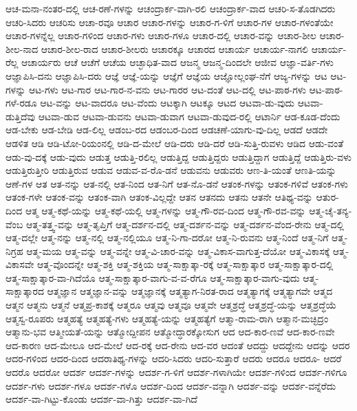 {ಆಚ-ಮನಾ-ನಂತರ-ದಲ್ಲಿ
ಆಚ-ರಣೆ-ಗಳನ್ನು
ಆಚಂದ್ರಾರ್ಕ-ವಾಗಿ-ರಲಿ
ಆಚಂದ್ರಾರ್ಕ-ವಾದ
ಆಚರಿ-ಸ-ತೊಡಗಿದರು
ಆಚರಿ-ಸಿದರು
ಆಚರಿಸು
ಆಚಾ-ರವೂ
ಆಚಾರ
ಆಚಾರ-ಗಳನ್ನು
ಆಚಾರ-ಗ-ಳಿಗೆ
ಆಚಾರ-ಗಳ
ಆಚಾರ-ಗಳಂತೆಯೇ
ಆಚಾರ-ಗಳನ್ನೆಲ್ಲ
ಆಚಾರ-ಗಳಿಂದ
ಆಚಾರ-ಗಳು
ಆಚಾರ-ಗಳೂ
ಆಚಾರ-ದಲ್ಲಿ
ಆಚಾರ-ವನ್ನು
ಆಚಾರ-ಶೀಲ
ಆಚಾರ-ಶೀಲ-ನಾದ
ಆಚಾರ-ಶೀಲ-ರಾದ
ಆಚಾರ-ಶೀಲರು
ಆಚಾರಕ್ಕೂ
ಆಚಾರದ
ಆಚಾರ್ಯ
ಆಚಾರ್ಯ-ನಾಗಲಿ
ಆಚಾರ್ಯ-ರೆಲ್ಲ
ಆಚಾರ್ಯರು
ಆಚೆ
ಆಚೆಗೆ
ಆಚೆಯ
ಆಚ್ಛಾಧಿತ-ವಾದ
ಆಜನ್ಮ
ಆಜನ್ಮ-ದಿಂದಲೇ
ಆಜೀವ
ಆಜ್ಞಾ-ವರ್ತಿ-ಗಳು
ಆಜ್ಞಾಪಿಸಿ-ದನು
ಆಜ್ಞಾಪಿಸಿ-ದರು
ಆಜ್ಞೆ
ಆಜ್ಞೆ-ಯನ್ನು
ಆಜ್ಞೆಗೆ
ಆಜ್ಞೆಯ
ಆಜ್ಞೋಲ್ಲಂಘ-ನೆಗೆ
ಆಜ್ಯ-ಗಳನ್ನು
ಆಟ
ಆಟ-ಗಳನ್ನು
ಆಟ-ಗಳು
ಆಟ-ಗಾರ
ಆಟ-ಗಾರ-ನ-ವನು
ಆಟ-ಗಾರರ
ಆಟ-ದಂತೆ
ಆಟ-ದಲ್ಲಿ
ಆಟ-ಪಾಠ-ಗಳು
ಆಟ-ಪಾಠ-ಗಳೆ-ರಡೂ
ಆಟ-ವನ್ನು
ಆಟ-ವಾದರೂ
ಆಟ-ವೆಂದು
ಆಟಕ್ಕಾಗಿ
ಆಟಕ್ಕೂ
ಆಟದ
ಆಟವಾ-ಡು-ವುದು
ಆಟವಾ-ಡುತ್ತಿದೆವು
ಆಟವಾ-ಡುವ
ಆಟವಾ-ಡುವನು
ಆಟವಾ-ಡುವಾಗ
ಆಟವಾ-ಡುವುದ-ರಲ್ಲಿ
ಆಟಾರ್ನಿ
ಆಡ-ಕೂಡ-ದೆಂದು
ಆಡ-ಬೇಕು
ಆಡ-ಬೇಡಿ
ಆಡ-ಲಿಲ್ಲ
ಆಡಂಬ-ರದ
ಆಡಂಬರ-ದಿಂದ
ಆಡಚಣೆ-ಯಾಗು-ವು-ದಿಲ್ಲ
ಆಡದೆ
ಆಡದೇ
ಆಡಳಿತ
ಆಡಿ
ಆಡಿ-ಟೋ-ರಿಯಂನಲ್ಲಿ
ಆಡಿ-ದ-ಮೇಲೆ
ಆಡಿ-ದರು
ಆಡಿ-ದರೆ
ಆಡಿ-ಸುತ್ತಿ-ರುವಳು
ಆಡಿದ
ಆಡು-ವಂತೆ
ಆಡು-ವು-ದಕ್ಕೆ
ಆಡು-ವುದು
ಆಡುತ್ತ
ಆಡುತ್ತಿ-ರಲಿಲ್ಲ
ಆಡುತ್ತಿದ್ದ
ಆಡುತ್ತಿದ್ದರು
ಆಡುತ್ತಿದ್ದಾಗ
ಆಡುತ್ತಿದ್ದೆ
ಆಡುತ್ತಿರು-ವಳು
ಆಡುತ್ತಿರುತ್ತೀರಿ
ಆಡುತ್ತಿರುವ
ಆಡುವ
ಆಡುವ-ವ-ರೊ-ಡನೆ
ಆಡುವನು
ಆಡುವರು
ಆಣ-ತಿ-ಯಂತೆ
ಆಣತಿ-ಯನ್ನು
ಆಣೆ-ಗಳ
ಆತ
ಆತ-ನನ್ನು
ಆತ-ನಲ್ಲಿ
ಆತ-ನಿಂದ
ಆತ-ನಿಗೆ
ಆತ-ನೊ-ಡನೆ
ಆತಂಕ-ಗಳನ್ನು
ಆತಂಕ-ಗಳಿವೆ
ಆತಂಕ-ಗಳು
ಆತಂಕ-ಗಳೇ
ಆತಂಕ-ವನ್ನು
ಆತಂಕ-ವಾಗಿ
ಆತಂಕ-ವಿಲ್ಲದ್ದೇ
ಆತನ
ಆತನದು
ಆತನು
ಆತನೇ
ಆತಿಥ್ಯ-ವನ್ನು
ಆತುರ-ದಿಂದ
ಆತ್ಮ
ಆತ್ಮ-ಕಥೆ-ಯನ್ನು
ಆತ್ಮ-ಕಥೆ-ಯಲ್ಲಿ
ಆತ್ಮ-ಗಳನ್ನು
ಆತ್ಮ-ಗೌ-ರವ-ದಿಂದ
ಆತ್ಮ-ಗೌ-ರವ-ವನ್ನು
ಆತ್ಮ-ಚೈ-ತನ್ಯ-ವೆಂಬ
ಆತ್ಮ-ತತ್ತ್ವ-ವನ್ನು
ಆತ್ಮ-ತೃಪ್ತಿಗೆ
ಆತ್ಮ-ದರ್ಶನ-ದಲ್ಲಿ
ಆತ್ಮ-ದರ್ಶನ-ವನ್ನು
ಆತ್ಮ-ದರ್ಶನ-ವೆಂದ-ರೇನು
ಆತ್ಮ-ದಲ್ಲಿ
ಆತ್ಮ-ದಲ್ಲೇ
ಆತ್ಮ-ನನ್ನು
ಆತ್ಮ-ನಲ್ಲಿ
ಆತ್ಮ-ನಲ್ಲಿಯೂ
ಆತ್ಮ-ನಿ-ಗಾ-ದರೋ
ಆತ್ಮ-ನಿ-ರುವನು
ಆತ್ಮ-ನಿಂದೆ
ಆತ್ಮ-ನಿಗೆ
ಆತ್ಮ-ನಿಗ್ರಹ
ಆತ್ಮ-ಮಯ
ಆತ್ಮ-ವನ್ನು
ಆತ್ಮ-ವನ್ನೇ
ಆತ್ಮ-ವಿ-ಚಾರ-ವನ್ನು
ಆತ್ಮ-ವಿಕಾಸ-ವಾಗುತ್ತ-ದೆಯೋ
ಆತ್ಮ-ವಿಕಾಸಕ್ಕೆ
ಆತ್ಮ-ವಿಕಾಸವೇ
ಆತ್ಮ-ವೊಂದನ್ನೇ
ಆತ್ಮ-ಶಕ್ತಿ
ಆತ್ಮ-ಶಕ್ತಿಯ
ಆತ್ಮ-ಸಾಕ್ಷಾತ್ಕಾ-ರಕ್ಕೆ
ಆತ್ಮ-ಸಾಕ್ಷಾತ್ಕಾರ
ಆತ್ಮ-ಸಾಕ್ಷಾತ್ಕಾರ-ದಲ್ಲಿ
ಆತ್ಮ-ಸಾಕ್ಷಾತ್ಕಾರ-ವಾ-ಗಿದೆಯೊ
ಆತ್ಮ-ಸಾಕ್ಷಾತ್ಕಾರ-ವಾಗು-ವ-ವ-ರೆಗೂ
ಆತ್ಮ-ಸಾಕ್ಷಾತ್ಕಾರ-ವಾಗು-ವುದು
ಆತ್ಮ-ಸಾಕ್ಷಾತ್ಕಾರದ
ಆತ್ಮಜ್ಞಾನ
ಆತ್ಮಜ್ಞಾನ-ವನ್ನು
ಆತ್ಮಜ್ಞಾನಕ್ಕೆ
ಆತ್ಮತ್ಯಾಗ-ನಿರತ-ರಾದ
ಆತ್ಮತ್ಯಾಗಕ್ಕೆ
ಆತ್ಮತ್ಯಾಗವೇ
ಆತ್ಮದ
ಆತ್ಮನ
ಆತ್ಮನು
ಆತ್ಮನೆ
ಆತ್ಮಪ್ರ-ಕಾಶಕ್ಕೆ
ಆತ್ಮರೂ
ಆತ್ಮವು
ಆತ್ಮವೂ
ಆತ್ಮವೇ
ಆತ್ಮಶ್ರದ್ಧೆ
ಆತ್ಮಶ್ರದ್ಧೆ-ಯನ್ನು
ಆತ್ಮಶ್ರದ್ಧೆಯೆ
ಆತ್ಮಸ್ವ-ರೂಪರು
ಆತ್ಮಹತ್ಯೆ
ಆತ್ಮಹತ್ಯೆ-ಗಳು
ಆತ್ಮಹತ್ಯೆ-ಯನ್ನು
ಆತ್ಮಹತ್ಯೆಗೆ
ಆತ್ಮಾ-ರಾಮ-ರಾಗಿ
ಆತ್ಮಾನ-ಮಚ್ಛಿದ್ರಂ
ಆತ್ಮಾನು-ಭವ
ಆತ್ಮೀಯತೆ-ಯನ್ನು
ಆತ್ಮೋದ್ದೀಪನ
ಆತ್ಮೋದ್ಧಾರಕ್ಕೋಸುಗ
ಆದ
ಆದ-ಕಾರ-ಣವೆ
ಆದ-ಕಾರ-ಣವೇ
ಆದ-ಕಾರಣ
ಆದ-ಮೇಲೂ
ಆದ-ಮೇಲೆ
ಆದ-ರಕ್ಕೆ
ಆದ-ರೇನು
ಆದ-ವರ
ಆದಂತೆ
ಆದದ್ದು
ಆದದ್ದೇನು
ಆದನ್ನು
ಆದರ
ಆದರ-ಗಳಿಂದ
ಆದರ-ದಿಂದ
ಆದರಾತಿಥ್ಯ-ಗಳನ್ನು
ಆದರಿ-ಸಿದರು
ಆದರಿ-ಸುತ್ತಾರೆ
ಆದರು
ಆದರೂ
ಆದರೂ-
ಆದರೆ
ಆದರೊ
ಆದರೋ
ಆದರ್ಶ
ಆದರ್ಶ-ಗಳನ್ನು
ಆದರ್ಶ-ಗ-ಳಿಗೆ
ಆದರ್ಶ-ಗಳಾಗಿಯೇ
ಆದರ್ಶ-ಗಳಿಂದ
ಆದರ್ಶ-ಗಳಿಗೂ
ಆದರ್ಶ-ಗಳು
ಆದರ್ಶ-ಗಳೂ
ಆದರ್ಶ-ಗಳೊ
ಆದರ್ಶ-ದಿಂದ
ಆದರ್ಶ-ವನ್ನಾಗಿ
ಆದರ್ಶ-ವನ್ನು
ಆದರ್ಶ-ವನ್ನೆರೆದು
ಆದರ್ಶ-ವಾ-ಗಿಟ್ಟು-ಕೊಂಡು
ಆದರ್ಶ-ವಾ-ಗಿತ್ತು
ಆದರ್ಶ-ವಾ-ಗಿದೆ
}
